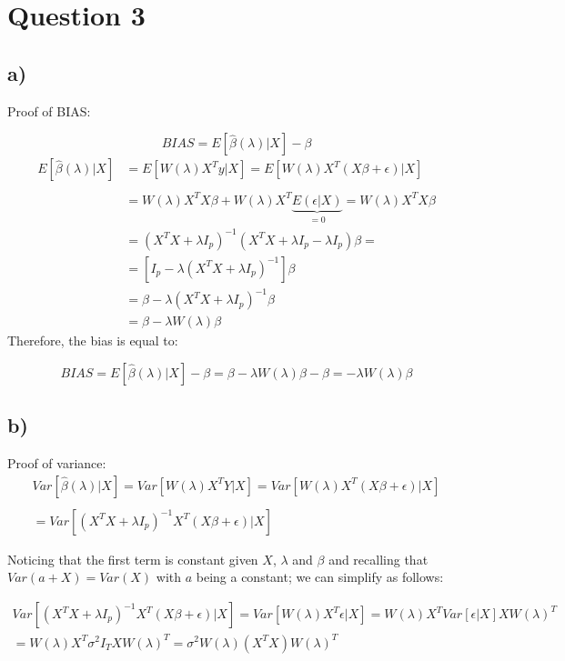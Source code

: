 \documentclass[
]{article}
\begin{document}
\hypertarget{question-3}{%
\section{Question 3}\label{question-3}}

\hypertarget{a-1}{%
\subsection{a)}\label{a-1}}

Proof of BIAS:

\[BIAS=E[\hat{\beta}(\lambda)|X]-\beta \] \begin{align*}
E[\hat{\beta}(\lambda)|X]&=E[W(\lambda)X^T y|X]=E[W(\lambda)X^T (X\beta+\epsilon)|X] \\
\\
&= W(\lambda)X^T X\beta+W(\lambda)X^T \underbrace{E(\epsilon|X)}_{=0} = W(\lambda)X^T X\beta \\
&=(X^TX+\lambda I_p)^{-1}(X^TX+\lambda I_p-\lambda I_p)\beta=\\
&=\left[I_p-\lambda(X^TX+\lambda I_p)^{-1}\right]\beta\\
&=\beta-\lambda(X^TX+\lambda I_p)^{-1}\beta\\
&=\beta-\lambda W(\lambda)\beta
\end{align*} Therefore, the bias is equal to:

\begin{equation*}
BIAS=E[\hat{\beta}(\lambda)|X]-\beta=\beta-\lambda W(\lambda)\beta-\beta=-\lambda W(\lambda)\beta
\end{equation*}

\hypertarget{b-1}{%
\subsection{b)}\label{b-1}}

Proof of variance: \begin{gather*}
Var[\hat{\beta}(\lambda)|X]=Var[W(\lambda)X^T Y|X]=Var[W(\lambda)X^T (X\beta+\epsilon)|X] \\
\\
=Var[(X^TX+\lambda I_p)^{-1}X^T (X\beta+\epsilon)|X]
\end{gather*}

Noticing that the first term is constant given \(X\), \(\lambda\) and
\(\beta\) and recalling that \(Var(a+X)=Var(X)\) with \(a\) being a
constant; we can simplify as follows:

\begin{gather*}
Var[(X^TX+\lambda I_p)^{-1}X^T (X\beta+\epsilon)|X]=Var[W(\lambda)X^T\epsilon|X]=W(\lambda)X^TVar[\epsilon|X]XW(\lambda)^T \\
=W(\lambda)X^T\sigma^2I_T X W(\lambda)^T=\sigma^2W(\lambda)(X^TX) W(\lambda)^T
\end{gather*}
\end{document}
